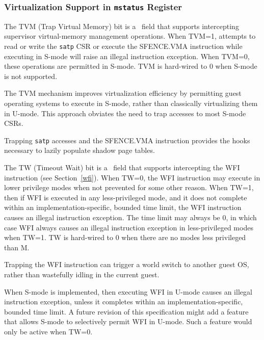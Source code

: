 \subsubsection{Virtualization Support in {\tt mstatus} Register}
\label{virt-control}

The TVM (Trap Virtual Memory) bit is a \warl\ field that supports intercepting
supervisor virtual-memory management operations.  When TVM=1,
attempts to read or write the {\tt satp} CSR or execute the SFENCE.VMA
instruction while executing in S-mode will raise an illegal instruction
exception.  When TVM=0, these operations are permitted in S-mode.
TVM is hard-wired to 0 when S-mode is not supported.

\begin{commentary}
The TVM mechanism improves virtualization efficiency by permitting guest
operating systems to execute in S-mode, rather than classically virtualizing
them in U-mode.  This approach obviates the need to trap accesses to most
S-mode CSRs.

Trapping {\tt satp} accesses and the SFENCE.VMA instruction provides the
hooks necessary to lazily populate shadow page tables.
\end{commentary}

The TW (Timeout Wait) bit is a \warl\ field that supports intercepting the WFI
instruction (see Section~\ref{wfi}).
When TW=0, the WFI instruction may execute in lower
privilege modes when not prevented for some other reason.  When TW=1,
then if WFI is executed in any less-privileged mode, and it does not complete
within an implementation-specific, bounded time limit, the WFI instruction
causes an illegal instruction exception.  The time limit may always be 0, in which
case WFI always causes an illegal instruction exception in less-privileged modes
when TW=1.  TW is hard-wired to 0 when there are no modes less privileged than
M.

\begin{commentary}
Trapping the WFI
instruction can trigger a world switch to another guest OS, rather than
wastefully idling in the current guest.
\end{commentary}

When S-mode is implemented, then executing WFI in U-mode causes an illegal
instruction exception, unless it completes within an implementation-specific,
bounded time limit.  A future revision of this specification might add
a feature that allows S-mode to selectively permit WFI in U-mode.  Such
a feature would only be active when TW=0.


